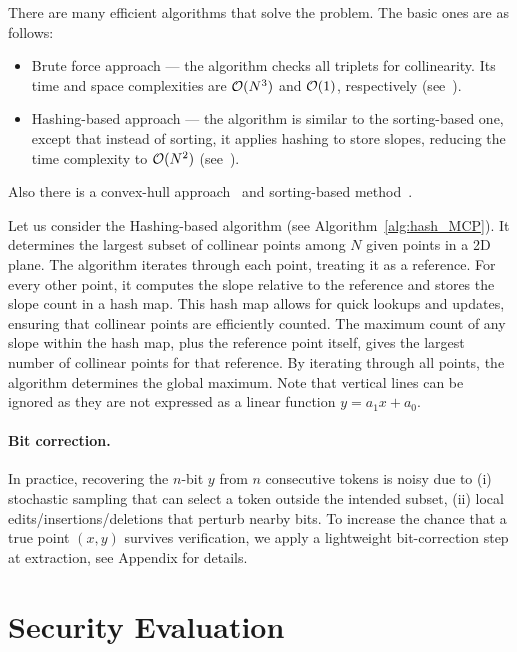 \documentclass[a4paper,11pt]{llncs}
\begin{document}
There are many efficient algorithms that solve the problem. The basic ones are as follows:
\begin{itemize}

    \item Brute force approach — the algorithm checks all triplets for collinearity. Its time and space complexities are ${\cal O}(N^3)$ and ${\cal O}(1)$, respectively (see~\cite{Cormen_2022}).

    \item Hashing-based approach — the algorithm is similar to the sorting-based one, except that instead of sorting, it applies hashing to store slopes, reducing the time complexity to ${\cal O}(N^2)$ (see~\cite{Cormen_2022}).

\end{itemize}

Also there is a convex-hull approach~\cite{Preparata_1985} and sorting-based method~\cite{Cormen_2022}.


Let us consider the Hashing-based algorithm (see Algorithm~\ref{alg:hash_MCP}).
It determines the largest subset of collinear points among $N$ given points in a 2D plane. The algorithm iterates through each point, treating it as a reference. For every other point, it computes the slope relative to the reference and stores the slope count in a hash map. This hash map allows for quick lookups and updates, ensuring that collinear points are efficiently counted. The maximum count of any slope within the hash map, plus the reference point itself, gives the largest number of collinear points for that reference. By iterating through all points, the algorithm determines the global maximum. Note that vertical lines can be ignored as they are not expressed as a linear function $y=a_1x + a_0$.

\paragraph{Bit correction.}
In practice, recovering the $n$-bit $y$ from $n$ consecutive tokens is noisy due to (i) stochastic sampling that can select a token outside the intended subset, (ii) local edits/insertions/deletions that perturb nearby bits. To increase the chance that a true point $(x,y)$ survives verification, we apply a lightweight bit-correction step at extraction, see Appendix for details.


\section{Security Evaluation}
\label{sec:security_evaluation}
\end{document}
